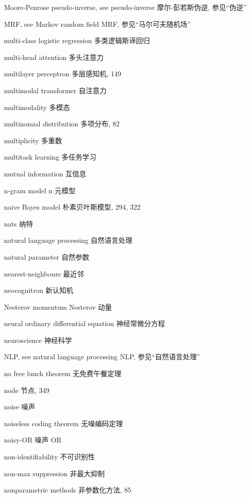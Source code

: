 Moore-Penrose pseudo-inverse, see pseudo-inverse  摩尔-彭若斯伪逆, 参见“伪逆” \par
MRF, see Markov random field  MRF, 参见“马尔可夫随机场” \par
multi-class logistic regression  多类逻辑斯谛回归 \par
multi-head attention  多头注意力 \par
multilayer perceptron  多层感知机, 149 \par
multimodal transformer  自注意力 \par
multimodality  多模态 \par
multinomial distribution  多项分布, 82 \par
multiplicity  多重数 \par
multitask learning  多任务学习 \par
mutual information  互信息 \par
n-gram model  n 元模型 \par
naive Bayes model  朴素贝叶斯模型, 294, 322 \par
nats  纳特 \par
natural language processing  自然语言处理 \par
natural parameter  自然参数 \par
nearest-neighbours  最近邻 \par
neocognitron  新认知机 \par
Nesterov momentum  Nesterov 动量 \par
neural ordinary differential equation  神经常微分方程 \par
neuroscience  神经科学 \par
NLP, see natural language processing  NLP, 参见“自然语言处理” \par
no free lunch theorem  无免费午餐定理 \par
node  节点, 349 \par
noise  噪声 \par
noiseless coding theorem  无噪编码定理 \par
noisy-OR  噪声 OR \par
non-identifiability  不可识别性 \par
non-max suppression  非最大抑制 \par
nonparametric methods  非参数化方法, 85 \par
